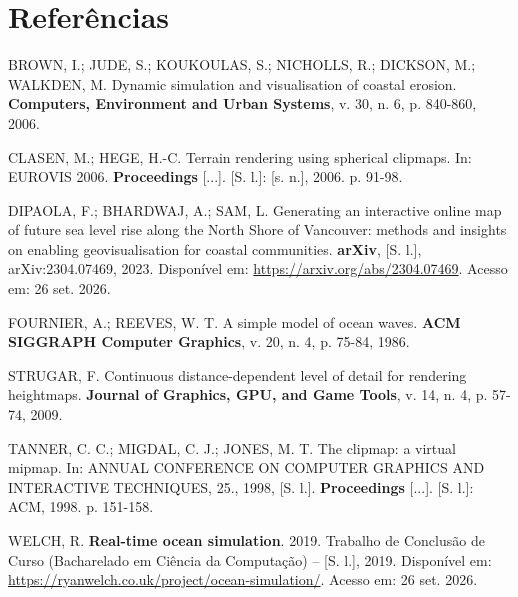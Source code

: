 \documentclass[conference]{IEEEtran}
\begin{document}
\section*{Referências}
\begingroup
\footnotesize
\raggedright
\setlength{\parindent}{0pt}
\setlength{\parskip}{4pt}

BROWN, I.; JUDE, S.; KOUKOULAS, S.; NICHOLLS, R.; DICKSON, M.; WALKDEN,
M. Dynamic simulation and visualisation of coastal erosion. \textbf{Computers,
Environment and Urban Systems}, v. 30, n. 6, p. 840-860, 2006.

CLASEN, M.; HEGE, H.-C. Terrain rendering using spherical clipmaps. In:
EUROVIS 2006. \textbf{Proceedings} [...]. [S. l.]: [s. n.], 2006. p. 91-98.

DIPAOLA, F.; BHARDWAJ, A.; SAM, L. Generating an interactive online map of
future sea level rise along the North Shore of Vancouver: methods and
insights on enabling geovisualisation for coastal communities. \textbf{arXiv},
[S. l.], arXiv:2304.07469, 2023. Disponível em:
\url{https://arxiv.org/abs/2304.07469}. Acesso em: 26 set. 2026.

FOURNIER, A.; REEVES, W. T. A simple model of ocean waves. \textbf{ACM
SIGGRAPH Computer Graphics}, v. 20, n. 4, p. 75-84, 1986.

STRUGAR, F. Continuous distance-dependent level of detail for rendering
heightmaps. \textbf{Journal of Graphics, GPU, and Game Tools}, v. 14, n. 4,
p. 57-74, 2009.

TANNER, C. C.; MIGDAL, C. J.; JONES, M. T. The clipmap: a virtual mipmap.
In: ANNUAL CONFERENCE ON COMPUTER GRAPHICS AND INTERACTIVE TECHNIQUES, 25.,
1998, [S. l.]. \textbf{Proceedings} [...]. [S. l.]: ACM, 1998. p. 151-158.

WELCH, R. \textbf{Real-time ocean simulation}. 2019. Trabalho de Conclusão
de Curso (Bacharelado em Ciência da Computação) -- [S. l.], 2019.
Disponível em: \url{https://ryanwelch.co.uk/project/ocean-simulation/}.
Acesso em: 26 set. 2026.
\endgroup
\end{document}
